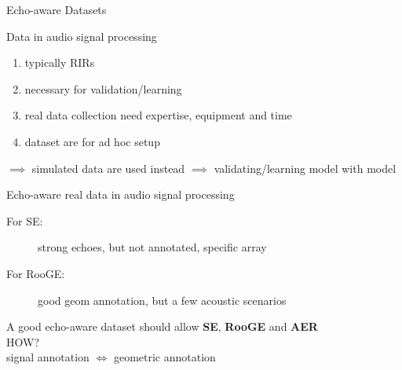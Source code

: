 \begin{frame}{Echo-aware Datasets}

    \begin{block}{\alert{Data} in audio signal processing}
        \begin{enumerate}
            \item typically RIRs
            \item necessary for validation/learning%
            \item real data collection need expertise, equipment and time
            \item dataset are for ad hoc setup
        \end{enumerate}

        \pause
        $\implies$ \alert{simulated data} are used instead $\implies$ \textcolor{myred}{validating/learning model with model}
    \end{block}

    \pause
    \begin{block}{\alert{Echo-aware real data} in audio signal processing}
        \vspace{-2mm}
        \begin{description}
            \item[For SE:] strong echoes\cmark, but not annotated\xmark, specific array\xmark
            \\{\small\cite{szoke2019building,bertin2019voicehome,remaggi2016acoustic}}
            \item[For RooGE:] good geom annotation\cmark, but a few acoustic scenarios\xmark
            \\{\small\cite{dokmanic2013acoustic,crocco2017uncalibrated,remaggi2019modeling}}
        \end{description}
    \end{block}

    \pause
    \begin{center}
        \textcolor{myred}{A good echo-aware dataset should allow \textbf{SE}, \textbf{RooGE} and \textbf{AER}
        \\HOW?
        \\signal annotation \quad $\Longleftrightarrow$ \quad geometric annotation}
    \end{center}

\end{frame}

